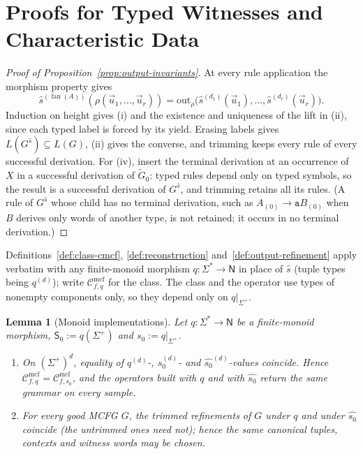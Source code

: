 \documentclass[11pt]{article}
\numberwithin{equation}{section}
\theoremstyle{plain}
\newtheorem{lemma}[theorem]{Lemma}
\theoremstyle{definition}
\theoremstyle{remark}
\newcommand{\Cmcf}[2]{\mathcal{C}^{\mathrm{mcf}}_{#1,#2}}
\newcommand{\out}{\mathrm{out}}
\newcommand{\tuple}[1]{\vec{#1}}
\newcommand{\fan}{\operatorname{fan}}
\theoremstyle{plain}
\begin{document}
\section{Proofs for Typed Witnesses and Characteristic Data}
\label{app:typed-witness-aux-proofs}

\begin{proof}[Proof of Proposition~\ref{prop:output-invariants}]
At every rule application the morphism property gives
\[
 \widehat s^{(\fan(A))}(\rho(\tuple u_1,\ldots,\tuple u_r))=
 \out_\rho\bigl(\widehat s^{(d_1)}(\tuple u_1),\ldots,\widehat s^{(d_r)}(\tuple u_r)\bigr).
\]  Induction on height gives (i) and the existence and uniqueness
of the lift in (ii), since each typed label is forced by its yield.  Erasing labels gives
$L(G^{\widehat s})\subseteq L(G)$, (ii) gives the converse, and trimming keeps every rule
of every successful derivation.  For (iv), insert the terminal derivation at an occurrence
of $X$ in a successful derivation of $\widetilde G_0$: typed rules depend only on typed
symbols, so the result is a successful derivation of $G^{\widehat s}$, and trimming retains
all its rules.  (A rule of $G^{\widehat s}$ whose child has no terminal derivation, such as
$A_{(0)}\to\mathtt aB_{(0)}$ when $B$ derives only words of another type, is not retained;
it occurs in no terminal derivation.)
\end{proof}

Definitions~\ref{def:class-cmcf}, \ref{def:reconstruction}
and~\ref{def:output-refinement} apply verbatim with any finite-monoid morphism
$q:\Sigma^*\to\mathsf N$ in place of $\widehat s$ (tuple types being $q^{(d)}$); write
$\Cmcf{f}{q}$ for the class.  The class and the operator use types of nonempty
components only, so they depend only on $q|_{\Sigma^+}$.

\begin{lemma}[Monoid implementations]
\label{lem:semigroup-transfer}
Let $q:\Sigma^*\to \mathsf N$ be a finite-monoid morphism, $\mathsf S_0:=q(\Sigma^+)$ and
$s_0:=q|_{\Sigma^+}$.
\begin{enumerate}[label=\textup{(\roman*)}]
\item On $(\Sigma^+)^d$, equality of $q^{(d)}$-, $s_0^{(d)}$- and
$\widehat{s_0}^{(d)}$-values coincide.  Hence $\Cmcf{f}{q}=\Cmcf{f}{s_0}$, and the
operators built with $q$ and with $\widehat{s_0}$ return the same grammar on every
sample.
\item For every good MCFG $G$, the trimmed refinements of $G$ under $q$ and under
$\widehat{s_0}$ coincide (the untrimmed ones need not); hence the same canonical
tuples, contexts and witness words may be chosen.
\end{enumerate}
\end{lemma}
\end{document}
